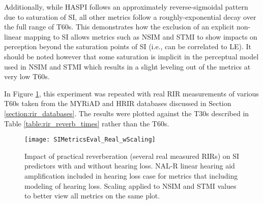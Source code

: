 Additionally, while HASPI follows an approximately reverse-sigmoidal pattern due to saturation of SI, all other metrics follow a roughly-exponential decay over the full range of T60s. This demonstrates how the exclusion of an explicit non-linear mapping to SI allows metrics such as NSIM and STMI to show impacts on perception beyond the saturation points of SI (i.e., can be correlated to LE). It should be noted however that some saturation is implicit in the perceptual model used in NSIM and STMI \citep{bruce2018phenomenological} which results in a slight leveling out of the metrics at very low T60s.

In Figure \ref{fig:SIMetricsEval_Real_wScaling}, this experiment was repeated with real RIR measurements of various T60s taken from the MYRiAD and HRIR databases discussed in Section \ref{section:rir_databases}. The results were plotted against the T30s described in Table \ref{table:rir_reverb_times} rather than the T60s. 



\begin{figure}[H]
	\texttt{[image: SIMetricsEval\_Real\_wScaling]}
	\centering
	\caption[Impact of real RIRs on proposed SI predictors (after scaling)]{Impact of practical reverberation (several real measured RIRs) on SI predictors with and without hearing loss. NAL-R linear hearing aid amplification included in hearing loss case for metrics that including modeling of hearing loss.  Scaling applied to NSIM and STMI values to better view all metrics on the same plot.}
	\label{fig:SIMetricsEval_Real_wScaling}
\end{figure}


